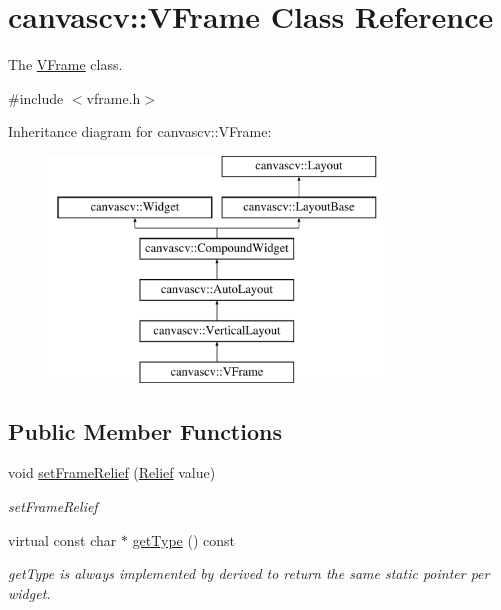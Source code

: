 \hypertarget{classcanvascv_1_1VFrame}{}\section{canvascv\+:\+:V\+Frame Class Reference}
\label{classcanvascv_1_1VFrame}


The \hyperlink{classcanvascv_1_1VFrame}{V\+Frame} class.  




{\ttfamily \#include $<$vframe.\+h$>$}

Inheritance diagram for canvascv\+:\+:V\+Frame\+:\begin{figure}[H]
\begin{center}
\leavevmode
\includegraphics[height=6.000000cm]{classcanvascv_1_1VFrame}
\end{center}
\end{figure}
\subsection*{Public Member Functions}
\begin{DoxyCompactItemize}
\item 
void \hyperlink{classcanvascv_1_1VFrame_aa99d2a36a61eca36d3e3ba0972df65b4}{set\+Frame\+Relief} (\hyperlink{classcanvascv_1_1Widget_a8253daa509c55c24c92ce0d3dd93e4cd}{Relief} value)
\begin{DoxyCompactList}\small\item\em set\+Frame\+Relief \end{DoxyCompactList}\item 
virtual const char $\ast$ \hyperlink{classcanvascv_1_1VFrame_a8a87d2a05ca0f42a8deeaefa698347a9}{get\+Type} () const 
\begin{DoxyCompactList}\small\item\em get\+Type is always implemented by derived to return the same static pointer per widget. \end{DoxyCompactList}\end{DoxyCompactItemize}
